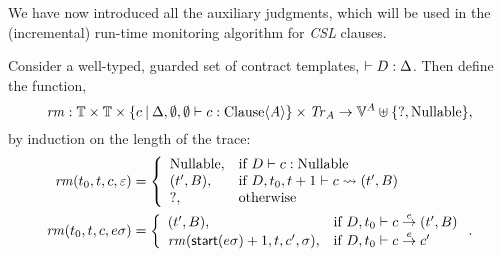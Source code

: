 \documentclass[orivec,final]{llncs-href}
\newcommand{\timeset}{\mathbb{T}}
\newcommand{\traceset}[1]{\mathit{Tr}_{#1}}
\newcommand{\verdictset}[1]{\mathbb{V}^{#1}}
\newcommand{\tracestart}{\mathsf{start}}
\newcommand{\trace}{\sigma}
\newcommand{\emptytrace}{\varepsilon}
\newcommand{\partialok}{\mathrm{Nullable}}
\newcommand{\inconclusive}{\mathrm{?}}
\newcommand{\csl}{\textit{CSL}}
\begin{document}
We have now introduced all the auxiliary judgments, which will be used
in the (incremental) run-time monitoring algorithm for \csl{} clauses.
\begin{definition}
  Consider a well-typed, guarded set of contract templates,
  $\vdash D : \Delta$. Then define the function,
  \[
  \mathit{rm} : \timeset \times \timeset \times \left\{c \mathbin{|}
    \ctclause{\Delta}{\emptyset}{\emptyset}{c}{A} \right\} \times
  \traceset{A} \to \verdictset{A}
  \uplus \{\inconclusive,\partialok\},
  \]
  by induction on the length of the trace:
  \begin{align*}
    \mathit{rm}(t_0,t,c,\emptytrace) &= \left\{
      \begin{array}{ll}
        \partialok, & \mbox{if } \cnullable{D}{c}\\
        (t',B), & \mbox{if } \cupdate{D}{t_0}{t+1}{c}{(t',B)}\\
        \inconclusive, & \mbox{otherwise}
      \end{array}
    \right.\\
    \mathit{rm}(t_0,t,c,e\trace) &= \left\{
      \begin{array}{ll}
        (t',B), & \mbox{if } \cstep{D}{t_0}{c}{e}{(t',B)}\\
        \mathit{rm}(\tracestart(e\trace)+1,t,c',\trace), & \mbox{if }
        \cstep{D}{t_0}{c}{e}{c'}
      \end{array}
    \right. .
  \end{align*}
\end{definition}
\end{document}
